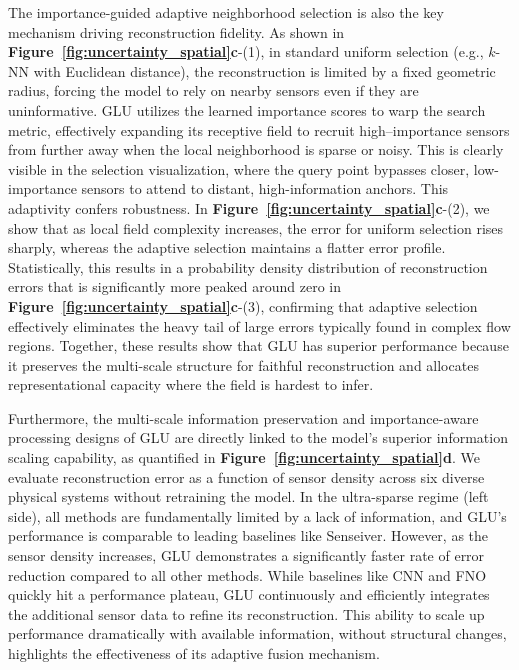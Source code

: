 \documentclass[pdflatex,sn-nature]{sn-jnl}%
\begin{document}
The importance-guided adaptive neighborhood selection is also the key mechanism driving reconstruction fidelity.
As shown in \textbf{Figure~\ref{fig:uncertainty_spatial}c}-(1), in standard uniform selection (e.g., $k$-NN with Euclidean distance), the reconstruction is limited by a fixed geometric radius, forcing the model to rely on nearby sensors even if they are uninformative. 
GLU utilizes the learned importance scores to warp the search metric, effectively expanding its receptive field to recruit high--importance sensors from further away when the local neighborhood is sparse or noisy. 
This is clearly visible in the selection visualization, where the query point bypasses closer, low-importance sensors to attend to distant, high-information anchors. 
This adaptivity confers robustness. 
In \textbf{Figure~\ref{fig:uncertainty_spatial}c}-(2), we show that as local field complexity increases, the error for uniform selection rises sharply, whereas the adaptive selection maintains a flatter error profile. 
Statistically, this results in a probability density distribution of reconstruction errors that is significantly more peaked around zero in \textbf{Figure~\ref{fig:uncertainty_spatial}c}-(3), confirming that adaptive selection effectively eliminates the heavy tail of large errors typically found in complex flow regions.
Together, these results show that GLU has superior performance because it preserves the multi-scale structure for faithful reconstruction and allocates representational capacity where the field is hardest to infer.

Furthermore, the multi-scale information preservation and importance-aware processing designs of GLU are directly linked to the model's superior information scaling capability, as quantified in \textbf{Figure~\ref{fig:uncertainty_spatial}d}. 
We evaluate reconstruction error as a function of sensor density across six diverse physical systems without retraining the model. 
In the ultra-sparse regime (left side), all methods are fundamentally limited by a lack of information, and GLU's performance is comparable to leading baselines like Senseiver. 
However, as the sensor density increases, GLU demonstrates a significantly faster rate of error reduction compared to all other methods. While baselines like CNN and FNO quickly hit a performance plateau, GLU continuously and efficiently integrates the additional sensor data to refine its reconstruction. 
This ability to scale up performance dramatically with available information, without structural changes, highlights the effectiveness of its adaptive fusion mechanism.
\end{document}
